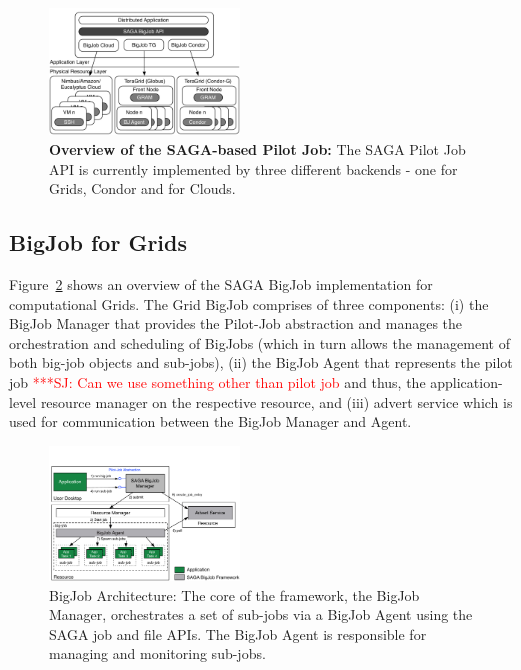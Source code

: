 \documentclass[conference,final]{IEEEtran}
\newcommand{\up}{\vspace*{-1em}}
\newcommand{\alnote}[1]{ {\textcolor{blue} { ***AL: #1 }}}
\newcommand{\jhanote}[1]{ {\textcolor{red} { ***SJ: #1 }}}
\newcommand{\alnote}[1]{}
\newcommand{\jhanote}[1]{}
\begin{document}
\begin{figure}[htbp]
    \centering
        \includegraphics[width=0.45\textwidth]{figures/distributed_pilot_job}
        \caption{\textbf{Overview of the SAGA-based Pilot Job:} The
          SAGA Pilot Job API is currently implemented by three
          different backends - one for Grids, Condor and for
          Clouds.\up}
    \label{fig:figures_distributed_pilot_job}
\end{figure}




\subsection{BigJob for Grids}
\up

Figure~\ref{fig:figures_bigjob} shows an overview of the SAGA BigJob
implementation for computational Grids. The Grid BigJob comprises of
three components: (i) the BigJob Manager that provides the Pilot-Job
abstraction and manages the orchestration and scheduling of BigJobs
(which in turn allows the management of both big-job objects and
sub-jobs), (ii) the BigJob Agent that represents the pilot job
\jhanote{Can we use something other than pilot job} and thus, the
application-level resource manager on the respective resource, and
(iii) advert service which is used for communication between the
BigJob Manager and Agent.


\begin{figure}[ht]
    \centering
    \includegraphics[width=0.45\textwidth]{figures/bigjob}
   \caption{BigJob Architecture: The core of the framework, the
      BigJob Manager, orchestrates a set of sub-jobs via a
      BigJob Agent using the SAGA job and file APIs.  The
      BigJob Agent is responsible for managing and monitoring sub-jobs.\up}
   \label{fig:figures_bigjob}
\end{figure}
\end{document}
